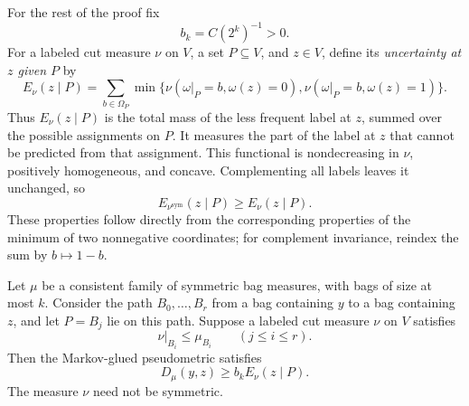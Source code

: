 For the rest of the proof fix
\begin{equation}\label{eq:bk-definition}
 b_k=C(2^k)^{-1}>0.
\end{equation}
For a labeled cut measure $\nu$ on $V$, a set $P\subseteq V$, and
$z\in V$, define
its \emph{uncertainty at $z$ given $P$} by
\begin{equation}\label{eq:uncertainty-definition}
 E_\nu(z\mid P)
 =\sum_{b\in\Omega_P}
   \min\bigl\{\nu(\omega|_P=b,\omega(z)=0),
              \nu(\omega|_P=b,\omega(z)=1)\bigr\}.
\end{equation}
Thus $E_\nu(z\mid P)$ is the total mass of the less frequent label at
$z$, summed over the possible assignments on $P$.  It measures the part
of the label at $z$ that cannot be predicted from that assignment.
This functional is nondecreasing in $\nu$, positively homogeneous, and
concave. Complementing all labels leaves it unchanged, so
\begin{equation}\label{eq:uncertainty-symmetrization}
 E_{\nu^{\mathrm{sym}}}(z\mid P)\geq E_\nu(z\mid P).
\end{equation}
These properties follow directly from the corresponding properties of
the minimum of two nonnegative coordinates; for complement invariance,
reindex the sum by $b\mapsto1-b$.

\begin{proposition}\label{prop:uncertainty}
Let $\mu$ be a consistent family of symmetric bag measures, with bags of
size at most $k$. Consider the path $B_0,\ldots,B_r$ from a bag
containing $y$ to a bag containing $z$, and let $P=B_j$ lie on this path.
Suppose a labeled cut measure $\nu$ on $V$ satisfies
\[
 \nu|_{B_i}\leq\mu_{B_i}\qquad(j\leq i\leq r).
\]
Then the Markov-glued pseudometric satisfies
\begin{equation}\label{eq:uncertainty-transport}
 D_\mu(y,z)\geq b_k E_\nu(z\mid P).
\end{equation}
The measure $\nu$ need not be symmetric.
\end{proposition}

